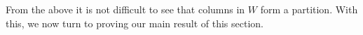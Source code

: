 \documentclass[11pt]{article}
\newcommand{\DD}{\diamonddiamond}
\begin{document}
 
From the above it is not difficult to see that columns in $W$ form a partition. With this, we now turn to proving our main result of this section.
 
\end{document}
